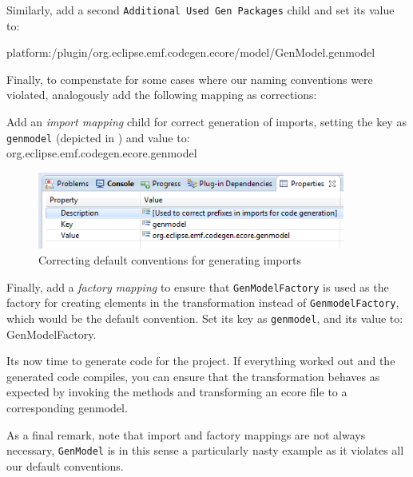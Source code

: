 \begin{stepbystep}

\item Similarly, add a second \texttt{Additional Used Gen Packages} child and set its value to: \\
\end{stepbystep}

\vspace{-1cm}
{\small \ttfamily platform:\-/\-plugin/\-org.\-eclipse.\-emf.\-codegen.\-ecore/\-model/\-GenModel.\-genmodel}

\newpage
Finally, to compenstate for some cases where our naming conventions were violated, analogously add the following mapping as corrections:

\begin{stepbystep}
\item Add an \emph{import mapping} child for correct generation of imports, setting the key as \texttt{genmodel} (depicted in ) and value to: \\
{\small \ttfamily \hspace*{0.5cm} org.\-eclipse.\-emf.\-codegen.\-ecore.\-genmodel}

\vspace{0.5cm}

\begin{figure}[htbp]
\begin{centering}
\includegraphics[width=0.9\textwidth]{../../org.moflon.doc.handbook.05_miscellaneous/3_existingEMF/emfImages/eclipse_importMappingValues}
  \caption{Correcting default conventions for generating imports}  
  \label{eclipse:impMapValues}
\end{centering}
\end{figure} 

\item Finally, add a \emph{factory mapping} to ensure that \texttt{GenModelFactory} is used as the factory for creating elements in the
transformation instead of \texttt{Genmodel\-Factory}, which would be the default convention. Set its key as \texttt{genmodel}, and its value to:
{\small \ttfamily GenModelFactory}.

\item Its now time to generate code for the project.
If everything worked out and the generated code compiles, you can ensure that the transformation behaves as expected by invoking the methods and transforming an ecore file to a corresponding genmodel.

\end{stepbystep}


As a final remark, note that import and factory mappings are not always necessary, \texttt{GenModel} is in this sense a particularly nasty example as it violates all our default conventions.
 